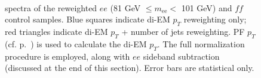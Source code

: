 \documentclass[dissertation.tex]{subfiles}
\begin{document}
\begin{figure}
	\\
	\hspace{1cm}
	\caption{\MET spectra of the reweighted $ee$ (81 GeV $\leq m_{\mathrm{ee}} <$ 101 GeV) and $\mathit{ff}$ control samples.  Blue squares indicate di-EM $p_{T}$ reweighting only; red triangles indicate di-EM $p_{T}$ + number of jets reweighting.  PF $p_{T}$ (cf. p.~\pageref{fig:MET_vs_di-EM_pT}) is used to calculate the di-EM $p_{T}$.  The full normalization procedure is employed, along with $ee$ sideband subtraction (discussed at the end of this section).  Error bars are statistical only.}
	\label{fig:dijet_pT_and_Nj_vs_dijet_pT_reweighting}
\end{figure}
\end{document}
